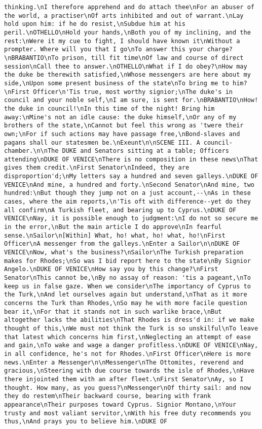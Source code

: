 \begin{verbatim}
thinking.\nI therefore apprehend and do attach thee\nFor an abuser of the world, a practiser\nOf arts inhibited and out of warrant.\nLay hold upon him: if he do resist,\nSubdue him at his peril.\nOTHELLO\nHold your hands,\nBoth you of my inclining, and the rest:\nWere it my cue to fight, I should have known it\nWithout a prompter. Where will you that I go\nTo answer this your charge?\nBRABANTIO\nTo prison, till fit time\nOf law and course of direct session\nCall thee to answer.\nOTHELLO\nWhat if I do obey?\nHow may the duke be therewith satisfied,\nWhose messengers are here about my side,\nUpon some present business of the state\nTo bring me to him?\nFirst Officer\n'Tis true, most worthy signior;\nThe duke's in council and your noble self,\nI am sure, is sent for.\nBRABANTIO\nHow! the duke in council!\nIn this time of the night! Bring him away:\nMine's not an idle cause: the duke himself,\nOr any of my brothers of the state,\nCannot but feel this wrong as 'twere their own;\nFor if such actions may have passage free,\nBond-slaves and pagans shall our statesmen be.\nExeunt\n\nSCENE III. A council-chamber.\n\nThe DUKE and Senators sitting at a table; Officers attending\nDUKE OF VENICE\nThere is no composition in these news\nThat gives them credit.\nFirst Senator\nIndeed, they are disproportion'd;\nMy letters say a hundred and seven galleys.\nDUKE OF VENICE\nAnd mine, a hundred and forty.\nSecond Senator\nAnd mine, two hundred:\nBut though they jump not on a just account,--\nAs in these cases, where the aim reports,\n'Tis oft with difference--yet do they all confirm\nA Turkish fleet, and bearing up to Cyprus.\nDUKE OF VENICE\nNay, it is possible enough to judgment:\nI do not so secure me in the error,\nBut the main article I do approve\nIn fearful sense.\nSailor\n[Within] What, ho! what, ho! what, ho!\nFirst Officer\nA messenger from the galleys.\nEnter a Sailor\n\nDUKE OF VENICE\nNow, what's the business?\nSailor\nThe Turkish preparation makes for Rhodes;\nSo was I bid report here to the state\nBy Signior Angelo.\nDUKE OF VENICE\nHow say you by this change?\nFirst Senator\nThis cannot be,\nBy no assay of reason: 'tis a pageant,\nTo keep us in false gaze. When we consider\nThe importancy of Cyprus to the Turk,\nAnd let ourselves again but understand,\nThat as it more concerns the Turk than Rhodes,\nSo may he with more facile question bear it,\nFor that it stands not in such warlike brace,\nBut altogether lacks the abilities\nThat Rhodes is dress'd in: if we make thought of this,\nWe must not think the Turk is so unskilful\nTo leave that latest which concerns him first,\nNeglecting an attempt of ease and gain,\nTo wake and wage a danger profitless.\nDUKE OF VENICE\nNay, in all confidence, he's not for Rhodes.\nFirst Officer\nHere is more news.\nEnter a Messenger\n\nMessenger\nThe Ottomites, reverend and gracious,\nSteering with due course towards the isle of Rhodes,\nHave there injointed them with an after fleet.\nFirst Senator\nAy, so I thought. How many, as you guess?\nMessenger\nOf thirty sail: and now they do restem\nTheir backward course, bearing with frank appearance\nTheir purposes toward Cyprus. Signior Montano,\nYour trusty and most valiant servitor,\nWith his free duty recommends you thus,\nAnd prays you to believe him.\nDUKE OF 
\end{verbatim}
